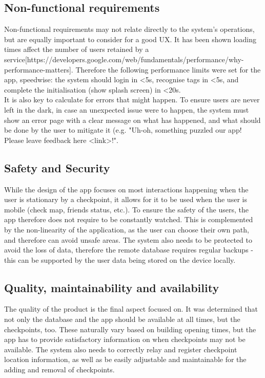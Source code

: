 \documentclass[a4,10pt,twocolumn]{article}
\begin{document}
\subsection*{Non-functional requirements}
Non-functional requirements may not relate directly to the system's operations, but are equally important to consider for a good UX. It has been shown loading times affect the number of users retained by a service[https://developers.google.com/web/fundamentals/performance/why-performance-matters]. Therefore the following performance limits were set for the app, speedwise: the system should login in <5s, recognise tags in <5s, and complete the initialisation (show splash screen) in <20s.\\
It is also key to calculate for errors that might happen. To ensure users are never left in the dark, in case an unexpected issue were to happen, the system must show an error page with a clear message on what has happened, and what should be done by the user to mitigate it (e.g. "Uh-oh, something puzzled our app! Please leave feedback here <link>!".
\subsection*{Safety and Security}
While the design of the app focuses on most interactions happening when the user is stationary by a checkpoint, it allows for it to be used when the user is mobile (check map, friends status, etc.). To ensure the safety of the users, the app therefore does not require to be constantly watched. This is complemented by the non-linearity of the application, as the user can choose their own path, and therefore can avoid unsafe areas. The system also needs to be protected to avoid the loss of data, therefore the remote database requires regular backups - this can be supported by the user data being stored on the device locally.
\subsection*{Quality, maintainability and availability}
The quality of the product is the final aspect focused on. It was determined that not only the database and the app should be available at all times, but the checkpoints, too. These naturally vary based on building opening times, but the app has to provide satisfactory information on when checkpoints may not be available. The system also needs to correctly relay and register checkpoint location information, as well as be easily adjustable and maintainable for the adding and removal of checkpoints. 
\end{document}
